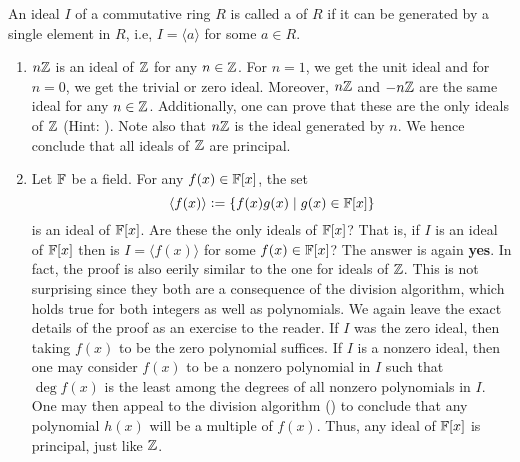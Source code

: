 \begin{defn}
   An ideal $I$ of a commutative ring $R$ is called a  of $R$ if it can be generated by a single element in $R$, i.e, $I = \langle a \rangle$ for some $a \in R$.
\end{defn}

\begin{ex} \label{ex:ideal-examples}
\phantom{hi}
\begin{enumerate}
    \item $n\mathbb{Z}$ is an ideal of $\mathbb{Z}$ for any $n \in \mathbb{Z}$. For $n=1$, we get the unit ideal and for $n=0$, we get the trivial or zero ideal. Moreover, $n\mathbb{Z}$ and $-n\mathbb{Z}$ are the same ideal for any $n \in \mathbb{Z}$. Additionally, one can prove that these are the only ideals of $\mathbb{Z}$ (Hint: ). Note also that $n\mathbb{Z}$ is the ideal generated by $n$. We hence conclude that all ideals of $\mathbb{Z}$ are principal.
    \item Let $\mathbb{F}$ be a field. For any $f(x) \in \mathbb{F}[x]$, the set
    \[
       \langle f(x) \rangle \vcentcolon= \left\{ f(x) g(x) \mid g(x) \in \mathbb{F}[x] \right\}
    \]
    is an ideal of $\mathbb{F}[x]$. Are these the only ideals of $\mathbb{F}[x]$? That is, if $I$ is an ideal of $\mathbb{F}[x]$ then is $I = \langle f(x) \rangle$ for some $f(x) \in \mathbb{F}[x]$? The answer is again \textbf{yes}. In fact, the proof is also eerily similar to the one for ideals of $\mathbb{Z}$. This is not surprising since they both are a consequence of the division algorithm, which holds true for both integers as well as polynomials. We again leave the exact details of the proof as an exercise to the reader. If $I$ was the zero ideal, then taking $f(x)$ to be the zero polynomial suffices. If $I$ is a nonzero ideal, then one may consider $f(x)$ to be a nonzero polynomial in $I$ such that $\deg f(x)$ is the least among the degrees of all nonzero polynomials in $I$. One may then appeal to the division algorithm () to conclude that any polynomial $h(x)$ will be a multiple of $f(x)$. Thus, any ideal of $\mathbb{F}[x]$ is principal, just like $\mathbb{Z}$.
    

\end{enumerate}
\end{ex}
